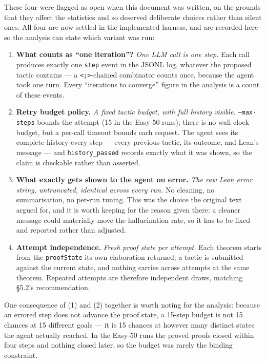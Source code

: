 These four were flagged as open when this document was written, on the grounds that they affect the statistics and so deserved deliberate choices rather than silent ones. All four are now settled in the implemented harness, and are recorded here so the analysis can state which variant was run:

\begin{enumerate}
  \item \textbf{What counts as ``one iteration''?} \emph{One LLM call is one step.} Each call produces exactly one \texttt{step} event in the JSONL log, whatever the proposed tactic contains --- a \texttt{<;>}-chained combinator counts once, because the agent took one turn. Every ``iterations to converge'' figure in the analysis is a count of these events.
  \item \textbf{Retry budget policy.} \emph{A fixed tactic budget, with full history visible.} \texttt{--max-steps} bounds the attempt (15 in the Easy-50 runs); there is no wall-clock budget, but a per-call timeout bounds each request. The agent sees its complete history every step --- every previous tactic, its outcome, and Lean's message --- and \texttt{history\_passed} records exactly what it was shown, so the claim is checkable rather than asserted.
  \item \textbf{What exactly gets shown to the agent on error.} \emph{The raw Lean error string, untruncated, identical across every run.} No cleaning, no summarisation, no per-run tuning. This was the choice the original text argued for, and it is worth keeping for the reason given there: a cleaner message could materially move the hallucination rate, so it has to be fixed and reported rather than adjusted.
  \item \textbf{Attempt independence.} \emph{Fresh proof state per attempt.} Each theorem starts from the \texttt{proofState} its own elaboration returned; a tactic is submitted against the current state, and nothing carries across attempts at the same theorem. Repeated attempts are therefore independent draws, matching \S5.2's recommendation.
\end{enumerate}

One consequence of (1) and (2) together is worth noting for the analysis: because an errored step does not advance the proof state, a 15-step budget is not 15 chances at 15 different goals --- it is 15 chances at however many distinct states the agent actually reached. In the Easy-50 runs the proved proofs closed within four steps and nothing closed later, so the budget was rarely the binding constraint.

